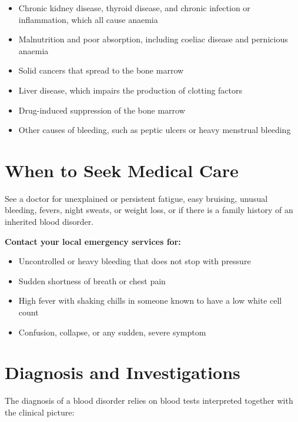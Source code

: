 \begin{itemize}
    \item Chronic kidney disease, thyroid disease, and chronic infection or inflammation, which all cause anaemia
    \item Malnutrition and poor absorption, including coeliac disease and pernicious anaemia
    \item Solid cancers that spread to the bone marrow
    \item Liver disease, which impairs the production of clotting factors
    \item Drug-induced suppression of the bone marrow
    \item Other causes of bleeding, such as peptic ulcers or heavy menstrual bleeding
\end{itemize}

\section*{When to Seek Medical Care}
See a doctor for unexplained or persistent fatigue, easy bruising, unusual bleeding, fevers, night sweats, or weight loss, or if there is a family history of an inherited blood disorder.

\textbf{Contact your local emergency services for:}
\begin{itemize}
    \item Uncontrolled or heavy bleeding that does not stop with pressure
    \item Sudden shortness of breath or chest pain
    \item High fever with shaking chills in someone known to have a low white cell count
    \item Confusion, collapse, or any sudden, severe symptom
\end{itemize}

\section*{Diagnosis and Investigations}
The diagnosis of a blood disorder relies on blood tests interpreted together with the clinical picture:

